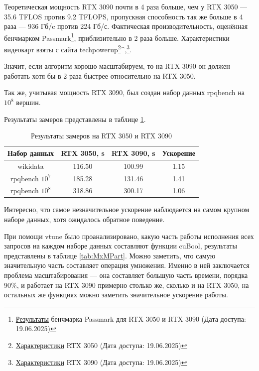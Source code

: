 Теоретическая мощность RTX 3090 почти в 4 раза больше, чем у RTX 3050 --- 35.6 TFLOS против 9.2 TFLOPS, пропускная способность так же больше в 4 раза --- 936 Гб/c против 224 Гб/с.
Фактическая производительность, оценённая бенчмарком Passmark\footnote{\href{https://www.videocardbenchmark.net/compare/4284vs4495/GeForce-RTX-3090-vs-GeForce-RTX-3050-8GB}{Результаты} бенчмарка Passmark для RTX 3050 и RTX 3090 (Дата доступа: 19.06.2025)}, приблизительно в 2 раза больше.
Характеристики видеокарт взяты с сайта techpowerup\footnote{\href{https://www.techpowerup.com/gpu-specs/geforce-rtx-3050.c3858}{Характеристики} RTX 3050 (Дата доступа: 19.06.2025)}^{,}\footnote{\href{https://www.techpowerup.com/gpu-specs/geforce-rtx-3090.c3622}{Характеристики} RTX 3090 (Дата доступа: 19.06.2025)}.

Значит, если алгоритм хорошо масштабируем, то на RTX 3090 он должен работать хотя бы в 2 раза быстрее относительно на RTX 3050.

Так же, учитывая мощность RTX 3090, был создан набор данных rpqbench на $10^8$ вершин.

Результаты замеров представлены в таблице \ref{tab:Cmp305090}.

\begin{table}[ht]
\centering
\caption{Результаты замеров на RTX 3050 и RTX 3090}
\label{tab:Cmp305090}
\begin{tabular}{|c|c|c|c|}
\hline
Набор данных & RTX 3050, \si{\second} & RTX 3090, \si{\second} & Ускорение \\
\hline
wikidata & 116.50 & 100.99 & 1.15 \\
\hline
rpqbench $10^7$ & 185.28 & 131.46 & 1.41 \\
\hline
rpqbench $10^8$ & 318.86 & 300.17 & 1.06 \\
\hline
\end{tabular}
\end{table}

Интересно, что самое незначительное ускорение наблюдается на самом крупном наборе данных, хотя ожидалось обратное поведение. 

При помощи vtune было проанализировано, какую часть работы исполнения всех запросов на каждом наборе данных составляют функции cuBool, результаты представлены в таблице \ref{tab:MxMPart}. Можно заметить, что самую значительную часть составляет операция умножения. Именно в ней заключается проблема масштабирования --- она составляет большую часть времени, порядка 90\%, и работает на RTX 3090 примерно столько же, сколько и на RTX 3050, на остальных же функциях можно заметить значительное ускорение работы. 

